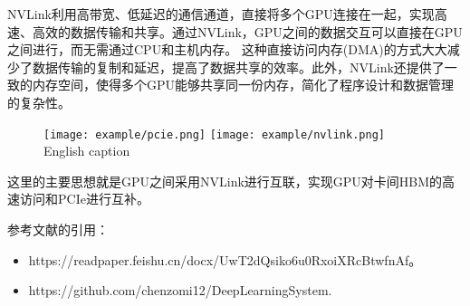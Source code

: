 NVLink利用高带宽、低延迟的通信通道，直接将多个GPU连接在一起，实现高速、高效的数据传输和共享。通过NVLink，GPU之间的数据交互可以直接在GPU之间进行，而无需通过CPU和主机内存。
这种直接访问内存(DMA)的方式大大减少了数据传输的复制和延迟，提高了数据共享的效率。此外，NVLink还提供了一致的内存空间，使得多个GPU能够共享同一份内存，简化了程序设计和数据管理的复杂性。

\begin{figure}[!htp]
    \centering
    \texttt{[image: example/pcie.png]}
    \hspace{1cm}
    \texttt{[image: example/nvlink.png]}
    {English caption}
    \label{fig5}
\end{figure}

这里的主要思想就是GPU之间采用NVLink进行互联，实现GPU对卡间HBM的高速访问和PCIe进行互补。

参考文献的引用：
\begin{itemize}
    \item https://readpaper.feishu.cn/docx/UwT2dQsiko6u0RxoiXRcBtwfnAf。
    \item https://github.com/chenzomi12/DeepLearningSystem.
\end{itemize}